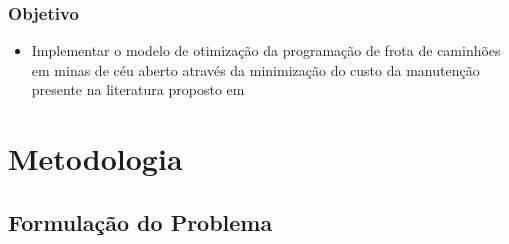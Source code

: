 \documentclass{beamer}
\begin{document}
\begin{frame}
	\frametitle{Objetivo}
	\begin{itemize}
		\item Implementar o modelo de otimização da programação de frota de caminhões em minas de céu aberto através da minimização do custo da manutenção presente na literatura proposto em \cite{topal2010a}
	\end{itemize}
\end{frame}

\section{Metodologia}
\subsection{Formulação do Problema}
\end{document}

